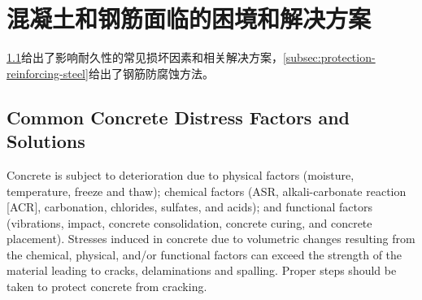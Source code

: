 \section{混凝土和钢筋面临的困境和解决方案}
\label{sec:concrete-steel-distresses-solutions}
\cref{subsec:common-factors}给出了影响耐久性的常见损坏因素和相关解决方案，\cref{subsec:protection-reinforcing-steel}给出了钢筋防腐蚀方法。

\subsection{Common Concrete Distress Factors and Solutions}
\label{subsec:common-factors}
Concrete is subject to deterioration due to physical factors (moisture, temperature, freeze and thaw); chemical factors (ASR, alkali-carbonate reaction [ACR], carbonation, chlorides, sulfates, and acids); and functional factors (vibrations, impact, concrete consolidation, concrete curing, and concrete placement). Stresses induced in concrete due to volumetric changes resulting from the chemical, physical, and/or functional factors can exceed the strength of the material leading to cracks, delaminations and spalling. Proper steps should be taken to protect concrete from cracking.

